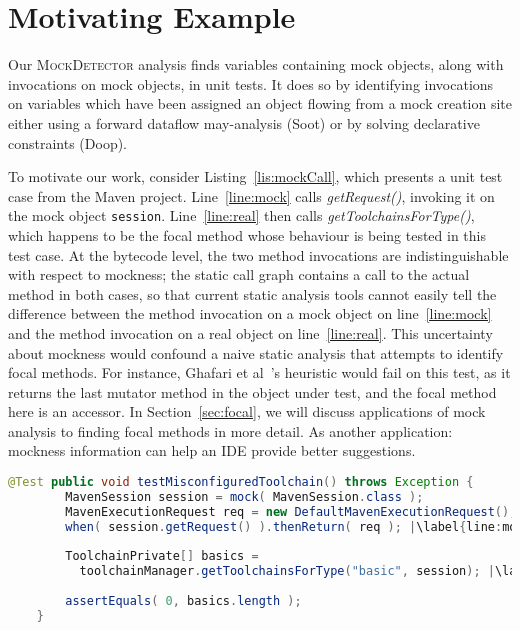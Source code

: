 \section{Motivating Example}
\label{sec:motivating-example}

Our \textsc{MockDetector} analysis finds variables containing mock objects, along with invocations on mock objects, in unit tests. It does so by identifying invocations on variables which have been assigned an object flowing from a mock creation site either using a forward dataflow may-analysis (Soot) or by solving declarative constraints (Doop).

To motivate our work, consider Listing~\ref{lis:mockCall}, which presents a unit test case from the Maven project. Line~\ref{line:mock} calls \textit{getRequest()}, invoking it on the mock object \texttt{session}. Line~\ref{line:real} then calls \textit{getToolchainsForType()}, which happens to be the focal method whose behaviour is being tested in this test case. At the bytecode level, the two method invocations are indistinguishable with respect to mockness; the static call graph contains a call to the actual method in both cases, so that current static analysis tools cannot easily tell the difference between the method invocation on a mock object on line~\ref{line:mock} and the method invocation on a real object on line~\ref{line:real}. This uncertainty about mockness would confound a naive static analysis that attempts to identify focal methods. For instance, Ghafari et al~\cite{ghafari15:_autom}'s heuristic would fail on this test, as it returns the last mutator method in the object under test, and the focal method here is an accessor. In Section~\ref{sec:focal}, we will discuss applications of mock analysis to finding focal methods in more detail. As another application: mockness information can help an IDE provide better suggestions. 

\begin{lstlisting}[basicstyle=\ttfamily, caption={This code snippet illustrates an example from maven-core, where calls to both the focal method \texttt{getToolchainsForType()} and to mock \texttt{session}'s \texttt{getRequest()} method occur in test \textit{testMisconfiguredToolchain()}.},
basicstyle=\scriptsize\ttfamily,language = Java, framesep=4.5mm, escapechar=|,
framexleftmargin=1.0mm, captionpos=b, label=lis:mockCall, morekeywords={@Test}]
	@Test public void testMisconfiguredToolchain() throws Exception {
	    MavenSession session = mock( MavenSession.class );
	    MavenExecutionRequest req = new DefaultMavenExecutionRequest();
	    when( session.getRequest() ).thenReturn( req ); |\label{line:mock}|
	    
	    ToolchainPrivate[] basics =
	      toolchainManager.getToolchainsForType("basic", session); |\label{line:real}|
	    
	    assertEquals( 0, basics.length );
	}
\end{lstlisting}

